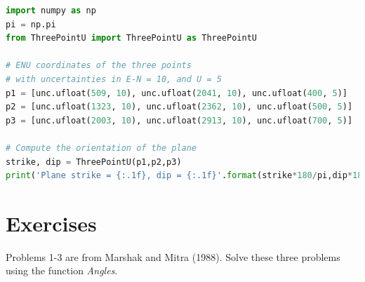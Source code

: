 \documentclass[a4paper , 12pt]{book}
\begin{document}
\begin{center}
\begin{lstlisting}[language=Python, frame=single]
import numpy as np
pi = np.pi
from ThreePointU import ThreePointU as ThreePointU

# ENU coordinates of the three points
# with uncertainties in E-N = 10, and U = 5
p1 = [unc.ufloat(509, 10), unc.ufloat(2041, 10), unc.ufloat(400, 5)]
p2 = [unc.ufloat(1323, 10), unc.ufloat(2362, 10), unc.ufloat(500, 5)]
p3 = [unc.ufloat(2003, 10), unc.ufloat(2913, 10), unc.ufloat(700, 5)]

# Compute the orientation of the plane
strike, dip = ThreePointU(p1,p2,p3)
print('Plane strike = {:.1f}, dip = {:.1f}'.format(strike*180/pi,dip*180/pi))
\end{lstlisting}
\end{center}

\section{Exercises}

Problems 1-3 are from Marshak and Mitra (1988). Solve these three problems using the function \textit{Angles}.
\end{document}
